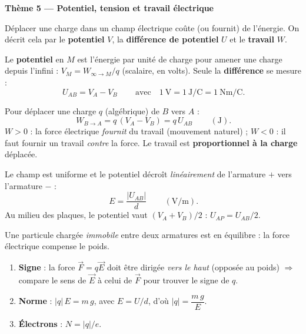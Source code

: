 \documentclass[11pt,a4paper]{article}
\newcommand{\vv}[1]{\vec{#1}}\newcommand{\ds}{\displaystyle}
\begin{document}

\begin{center}\large\bfseries\color{primarydark}
Thème 5 — Potentiel, tension et travail électrique
\end{center}

Déplacer une charge dans un champ électrique coûte (ou fournit) de l'énergie. On décrit cela par le
\textbf{potentiel} $V$, la \textbf{différence de potentiel} $U$ et le \textbf{travail} $W$.

\begin{cle}
Le \textbf{potentiel} en $M$ est l'énergie par unité de charge pour amener une charge depuis
l'infini : $V_M = W_{\infty\to M}/q$ (scalaire, en volts). Seule la \textbf{différence} se mesure :
\[ \boxed{\,U_{AB} = V_A - V_B\,}\qquad \text{avec}\quad \SI{1}{\volt} = \SI{1}{\joule\per\coulomb} = \SI{1}{\newton\metre\per\coulomb}. \]
\end{cle}

\begin{cle}
Pour déplacer une charge $q$ (algébrique) de $B$ vers $A$ :
\[ \boxed{\,W_{B\to A} = q\,(V_A - V_B) = q\,U_{AB}\,}\qquad(\si{\joule}). \]
$W>0$ : la force électrique \emph{fournit} du travail (mouvement naturel) ; $W<0$ : il faut fournir
un travail \emph{contre} la force. Le travail est \textbf{proportionnel à la charge} déplacée.
\end{cle}

\begin{cle}
Le champ est uniforme et le potentiel décroît \emph{linéairement} de l'armature $+$ vers l'armature
$-$ :
\[ \boxed{\,E = \dfrac{|U_{AB}|}{d}\,}\qquad(\si{\volt\per\metre}). \]
Au milieu des plaques, le potentiel vaut $(V_A+V_B)/2$ : $U_{AP} = U_{AB}/2$.
\end{cle}

\begin{methode}
Une particule chargée \emph{immobile} entre deux armatures est en équilibre : la force électrique
compense le poids.
\begin{enumerate}[leftmargin=1.6em,topsep=1pt,itemsep=1pt]
  \item \textbf{Signe} : la force $\vv{F}=q\vv{E}$ doit être dirigée \emph{vers le haut} (opposée au
        poids) $\Rightarrow$ compare le sens de $\vv{E}$ à celui de $\vv{F}$ pour trouver le signe de $q$.
  \item \textbf{Norme} : $|q|\,E = m\,g$, avec $E = U/d$, d'où $|q| = \dfrac{m\,g}{E}$.
  \item \textbf{Électrons} : $N = |q|/e$.
\end{enumerate}
\end{methode}
\end{document}
